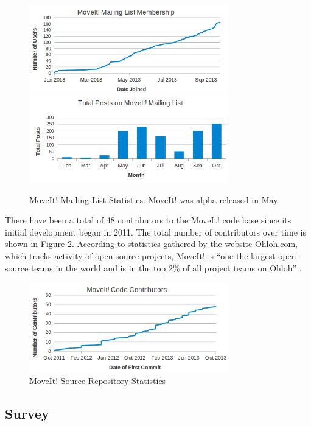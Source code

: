 \documentclass[10pt,journal,compsoc]{joser1}
\begin{document}
{\begin{figure}[!t]
\centering
\includegraphics[width=3.4in]{images/membership_plot}
\includegraphics[width=3.4in]{images/mailing_list}
\caption{MoveIt! Mailing List Statistics. MoveIt! was alpha released in May}
\label{fig:membership_plot}
\end{figure}

There have been a total of 48 contributors to the MoveIt! code base since its initial development began in 2011. The total number of contributors over time is shown in Figure \ref{fig:contributors}. According to statistics gathered by the website Ohloh.com, which tracks activity of open source projects, MoveIt! is ``one the largest open-source teams in the world and is in the top 2\% of all project teams on Ohloh'' \cite{ohloh}.

\begin{figure}[!t]
\centering
\includegraphics[width=3.4in]{images/moveit_contributors}
\caption{MoveIt! Source Repository Statistics}
\label{fig:contributors}
\end{figure}

\subsection{Survey}
\label{sec::survey}

}
\end{document}
